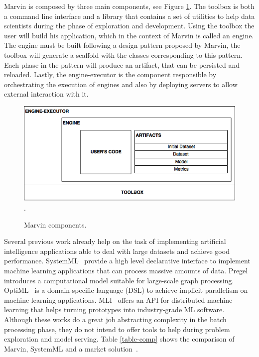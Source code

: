 \documentclass[twoside,11pt]{article}
\begin{document}
Marvin is composed by three main components, see Figure \ref{fig_components}. The toolbox is both a command line interface and a library that contains a set of utilities to help data scientists during the phase of exploration and development. Using the toolbox the user will build his application, which in the context of Marvin is called an engine. The engine must be built following a design pattern proposed by Marvin, the toolbox will generate a scaffold with the classes corresponding to this pattern. Each phase in the pattern will produce an artifact, that can be persisted and reloaded. Lastly, the engine-executor is the component responsible by orchestrating the execution of engines and also by deploying servers to allow external interaction with it.

\begin{figure}[h]
\centering
\includegraphics[scale=0.6]{fig/components.png}
\DeclareGraphicsExtensions.
\caption{Marvin components.}
\label{fig_components}
\end{figure}

Several previous work already help on the task of implementing artificial intelligence applications able to deal with large datasets and achieve good performance. SystemML~\citep{ghoting2011systemml} provide a high level declarative interface to implement machine learning applications that can process massive amounts of data. Pregel~\citep{malewicz2010pregel} introduces a computational model suitable for large-scale graph processing. OptiML~\citep{sujeeth2011optiml} is a domain-specific language (DSL) to achieve implicit parallelism on machine learning applications. MLI~\citep{sparks2013mli} offers an API for distributed machine learning that helps turning prototypes into industry-grade ML software. Although these works do a great job abstracting complexity in the batch processing phase, they do not intend to offer tools to help during problem exploration and model serving. Table \ref{table-comp} shows the comparison of Marvin, SystemML and a market solution~\citep{clouddsw}.
\end{document}
